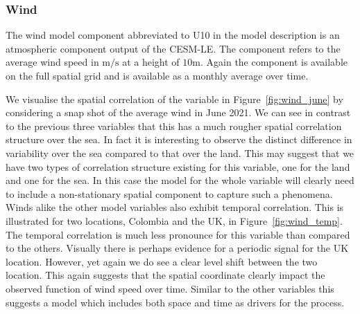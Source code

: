 \subsubsection{Wind \label{sssec:wind}}
The wind model component abbreviated to U10 in the model description is an atmospheric component output of the CESM-LE.
The component refers to the average wind speed in $\si{\meter\per\second}$ at a height of $10\si{\meter}$.
Again the component is available on the full spatial grid and is available as a monthly average over time.

We visualise the spatial correlation of the variable in Figure~\ref{fig:wind_june} by considering a snap shot of the average wind in June 2021.
We can see in contrast to the previous three variables that this has a much rougher spatial correlation structure over the sea. 
In fact it is interesting to observe the distinct difference in variability over the sea compared to that over the land. 
This may suggest that we have two types of correlation structure existing for this variable, one for the land and one for the sea. 
In this case the model for the whole variable will clearly need to include a non-stationary spatial component to capture such a phenomena.
Winds alike the other model variables also exhibit temporal correlation. 
This is illustrated for two locations, Colombia and the UK, in Figure~\ref{fig:wind_temp}. 
The temporal correlation is much less pronounce for this variable than compared to the others. 
Visually there is perhaps evidence for a periodic signal for the UK location. 
However, yet again we do see a clear level shift between the two location. 
This again suggests that the spatial coordinate clearly impact the observed function of wind speed over time.
Similar to the other variables this suggests a model which includes both space and time as drivers for the process.

